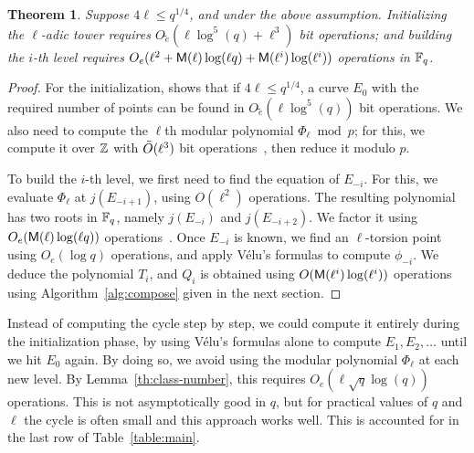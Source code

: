 \documentclass{sig-alternate}
\newtheorem{theorem}[definition]{Theorem}
\begin{document}
\begin{theorem}\label{theo:elliptic}
  \sloppy
  Suppose $4\ell\le q^{1/4}$, and under the above assumption.
  Initializing the $\ell$-adic tower requires
  $O\tilde{_e}(\ell\log^5(q)+\ell^3)$ bit operations; and building the
  $i$-th level requires $O_e(\ell^2+\mathsf{M}(\ell)\log(\ell
  q)+\mathsf{M}(\ell^i)\log(\ell^i))$ operations in $\mathbb{F}_q$.
\end{theorem}
\begin{proof}
  For the initialization, \cite[\S~4.3]{couveignes+lercier11}
  shows that if $4\ell\le q^{1/4}$, a curve $E_0$ with the required
  number of points can be found in $O\tilde{_e}(\ell\log^5(q))$ bit
  operations. We also need to compute the $\ell$th modular polynomial
  $\Phi_\ell\bmod p$; for this, we compute it over $\mathbb{Z}$ with
  $\tilde{O}(\ell^3)$ bit operations~\cite{enge09}, then reduce it
  modulo $p$.

  To build the $i$-th level, we first need to find the equation of
  $E_{-i}$. For this, we evaluate $\Phi_\ell$ at $j(E_{-i+1})$, using
  $O(\ell^2)$ operations. The resulting polynomial has two roots in
  $\mathbb{F}_q$, namely $j(E_{-i})$ and $j(E_{-i+2})$. We factor it using
  $O_e(\mathsf{M}(\ell)\log(\ell q))$ operations~\cite[Ch~14]{vzGG}. Once
  $E_{-i}$ is known, we find an $\ell$-torsion point using $O_e(\log
  q)$ operations, and apply Vélu's formulas to compute $\phi_{-i}$. We
  deduce the polynomial $T_i$, and $Q_i$ is obtained using
  $O(\mathsf{M}(\ell^i)\log(\ell^i))$ operations using
  Algorithm~\ref{alg:compose} given in the next section.
\end{proof}

\begin{remark}
  \label{rk:elliptic}
  Instead of computing the cycle step by step, we could compute it
  entirely during the initialization phase, by using Vélu's formulas
  alone to compute $E_1,E_2,\dots$ until we hit $E_0$ again. By doing
  so, we avoid using the modular polynomial $\Phi_\ell$ at each new
  level. By Lemma~\ref{th:class-number}, this requires
  $O_e(\ell\sqrt{q}\log(q))$ operations. This is not asymptotically good
  in $q$, but for practical values of $q$ and $\ell$ the cycle is often
  small and this approach works well. This is accounted for in the last
  row of Table~\ref{table:main}.  
\end{remark}

\end{document}

